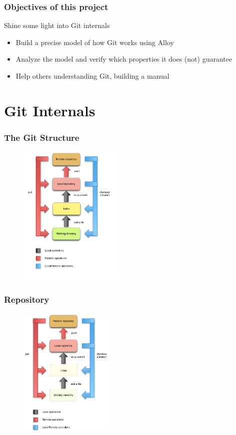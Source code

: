 \documentclass{beamer}
\begin{document}
\begin{frame}
	\frametitle{Objectives of this project}
	\begin{block}{Shine some light into Git internals}
		\begin{itemize}
			\item Build a precise model of how Git works using Alloy
			\item Analyze the model and verify which properties it
			does (not) guarantee
			\item Help others understanding Git, building a manual
		\end{itemize}
	\end{block}
\end{frame}


\section{Git Internals}

\begin{frame}
   \frametitle{The Git Structure}
   \begin{figure}
      \centering
      \includegraphics[width=0.45\textwidth]{images/git_workflow.png}
   \end{figure}
\end{frame}

\begin{frame}
   \frametitle{Repository}
   \begin{figure}
      \centering
      \includegraphics[width=0.4\textwidth]{images/workflow2.png}
   \end{figure}
\end{frame}
\end{document}
